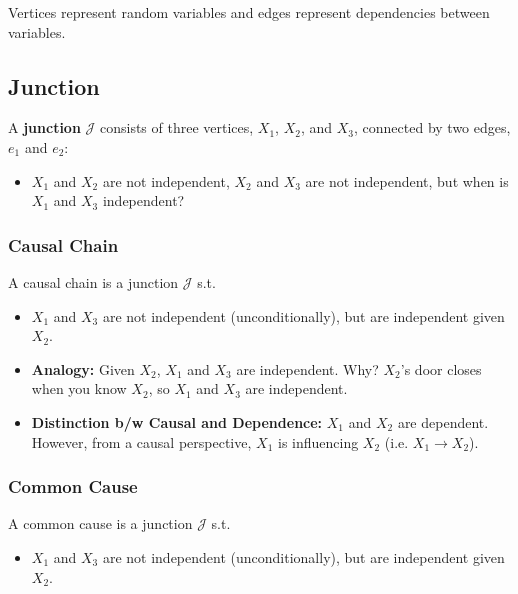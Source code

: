 \begin{definition}
    Vertices represent random variables and edges represent dependencies between variables.
\end{definition}

\subsection{Junction}
\begin{definition}
    A \textbf{junction} $\mathcal{J}$ consists of three vertices, $X_1$, $X_2$, and $X_3$, connected by two edges, $e_1$ and $e_2$:
    \begin{itemize}
        \item $X_1$ and $X_2$ are not independent, $X_2$ and $X_3$ are not independent, but when is $X_1$ and $X_3$ independent?
    \end{itemize}
\end{definition}

\subsubsection{Causal Chain}
\begin{definition}
    A causal chain is a junction $\mathcal{J}$ s.t. 
    \begin{itemize}
        \item $X_1$ and $X_3$ are not independent (unconditionally), but are independent given $X_2$.
    \end{itemize}
\end{definition}

\begin{notes}
    \begin{itemize}
        \item \textbf{Analogy:}  Given $X_2$, $X_1$ and $X_3$ are independent. Why? $X_2$'s door closes when you know $X_2$, so $X_1$ and $X_3$ are independent.
        \item \textbf{Distinction b/w Causal and Dependence:} $X_1$ and $X_2$ are dependent. However, from a causal perspective, $X_1$ is influencing $X_2$ (i.e. $X_1 \rightarrow X_2$).
    \end{itemize}
\end{notes}

\subsubsection{Common Cause}
\begin{definition}
    A common cause is a junction $\mathcal{J}$ s.t.
    \begin{itemize}
        \item $X_1$ and $X_3$ are not independent (unconditionally), but are independent given $X_2$.
    \end{itemize}
\end{definition}

